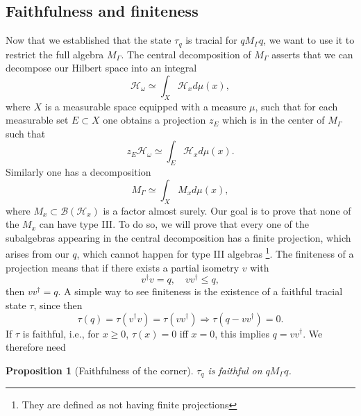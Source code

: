 \documentclass[aps,pra,reprint,superscriptaddress]{revtex4-2}
\newcommand{\cB}{{\mathcal B}}
\newcommand{\cH}{{\mathcal H}}
\newcommand\G{\Gamma}
\newcommand\m{\mu}
\renewcommand\t{\tau}
\newcommand\w{\omega}
\newtheorem{proposition}[theorem]{Proposition}
\theoremstyle{definition}
\theoremstyle{remark}
\begin{document}
\subsection{Faithfulness and finiteness}
Now that we established that the state $\t_q$ is tracial for $q M_\G q$, we
want to use it to restrict the full algebra $M_\G$. The central decomposition
of $M_\G$ asserts that we can decompose our Hilbert space into an integral
\begin{equation}
    \cH_\w \simeq \int_X \cH_x d\m(x),
\end{equation}
where $X$ is a measurable space equipped with a measure $\m$, such that for
each measurable set $E \subset X$ one obtains a projection $z_E$ which is in
the center of $M_\G$ such that
\begin{equation}
    z_E \cH_\w \simeq \int_E \cH_x d\m(x).
\end{equation}
Similarly one has a decomposition 
\begin{equation}
    M_\G \simeq \int_X M_x d\m(x),
\end{equation}
where $M_x \subset \cB(\cH_x)$ is a factor almost surely. Our goal is to prove
that none of the $M_x$ can have type III. To do so, we will prove that every
one of the subalgebras appearing in the central decomposition has a finite
projection, which arises from our $q$, which cannot happen for type III
algebras \footnote{They are defined as not having finite projections}.
The finiteness of a projection means that if there exists a partial isometry $v$
with
\begin{equation}
    v^\dagger v = q, \quad v v^\dagger \leq q,
\end{equation}
then $v v^\dagger = q$. A simple way to see finiteness is the existence of a
faithful tracial state $\t$, since then
\begin{equation}
    \t(q) = \t(v^\dagger v) = \t(v v^\dagger) \Rightarrow \t(q-v v^\dagger) =
    0.
\end{equation}
If $\t$ is faithful, i.e., for $x \geq 0$, $\t(x) = 0$ iff $x = 0$, this implies $q = v v^\dagger$.
We therefore need
\begin{proposition}[Faithfulness of the corner]\label{prop:faithful}
$\tau_q$ is faithful on $qM_\G q$.
\end{proposition}
\end{document}
